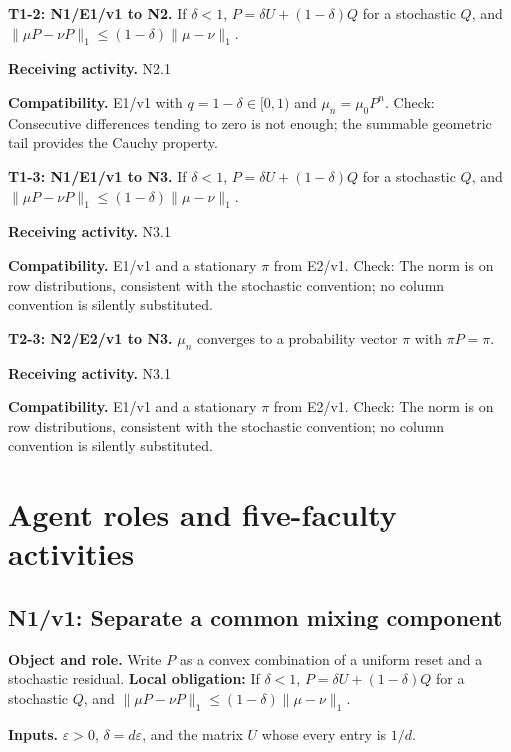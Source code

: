 \documentclass[preprint,12pt,aps,pra,showkeys,amsmath,amssymb,superscriptaddress,floatfix]{revtex4-2}
\theoremstyle{definition}
\theoremstyle{remark}
\newcommand{\field}[2]{\par\smallskip\noindent\textbf{#1.} #2\par}
\begin{document}
\begingroup\small\linespread{1.05}\selectfont

\field{T1-2: N1/E1/v1 to N2}{If \(\delta<1\), \(P=\delta U+(1-\delta)Q\) for a stochastic \(Q\), and
\(\|\mu P-\nu P\|_1\le(1-\delta)\|\mu-\nu\|_1\).}

\field{Receiving activity}{N2.1}

\field{Compatibility}{E1/v1 with \(q=1-\delta\in[0,1)\) and \(\mu_n=\mu_0P^n\). Check:
Consecutive differences tending to zero is not enough; the summable
geometric tail provides the Cauchy property.}

\field{T1-3: N1/E1/v1 to N3}{If \(\delta<1\), \(P=\delta U+(1-\delta)Q\) for a stochastic \(Q\), and
\(\|\mu P-\nu P\|_1\le(1-\delta)\|\mu-\nu\|_1\).}

\field{Receiving activity}{N3.1}

\field{Compatibility}{E1/v1 and a stationary \(\pi\) from E2/v1. Check: The norm is on row
distributions, consistent with the stochastic convention; no column
convention is silently substituted.}

\field{T2-3: N2/E2/v1 to N3}{\(\mu_n\) converges to a probability vector \(\pi\) with \(\pi P=\pi\).}

\field{Receiving activity}{N3.1}

\field{Compatibility}{E1/v1 and a stationary \(\pi\) from E2/v1. Check: The norm is on row
distributions, consistent with the stochastic convention; no column
convention is silently substituted.}

\endgroup

\clearpage\section{Agent roles and five-faculty activities}\begingroup\small\linespread{1.05}\selectfont{}

\subsection{N1/v1: Separate a common mixing component}

\field{Object and role}{Write \(P\) as a convex combination of a uniform reset and a stochastic
residual. \textbf{Local obligation:} If \(\delta<1\),
\(P=\delta U+(1-\delta)Q\) for a stochastic \(Q\), and
\(\|\mu P-\nu P\|_1\le(1-\delta)\|\mu-\nu\|_1\).}

\field{Inputs}{\(\varepsilon>0\), \(\delta=d\varepsilon\), and the matrix \(U\) whose
every entry is \(1/d\).}
\end{document}
